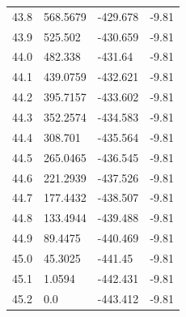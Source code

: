 \begin{table}[H]
\begin{tabular}{llll}
43.8 & 568.5679 & -429.678 & -9.81 \\
43.9 & 525.502 & -430.659 & -9.81 \\
44.0 & 482.338 & -431.64 & -9.81 \\
44.1 & 439.0759 & -432.621 & -9.81 \\
44.2 & 395.7157 & -433.602 & -9.81 \\
44.3 & 352.2574 & -434.583 & -9.81 \\
44.4 & 308.701 & -435.564 & -9.81 \\
44.5 & 265.0465 & -436.545 & -9.81 \\
44.6 & 221.2939 & -437.526 & -9.81 \\
44.7 & 177.4432 & -438.507 & -9.81 \\
44.8 & 133.4944 & -439.488 & -9.81 \\
44.9 & 89.4475 & -440.469 & -9.81 \\
45.0 & 45.3025 & -441.45 & -9.81 \\
45.1 & 1.0594 & -442.431 & -9.81 \\
45.2 & 0.0 & -443.412 & -9.81 \\
\bottomrule
\end{tabular}

\end{table}
